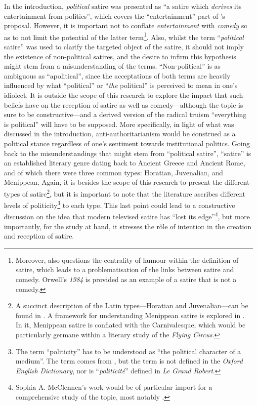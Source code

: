\documentclass[
,a4paper
,DIV=12
,12pt
,abstract
,bibliography=totoc
]{scrartcl}
\begin{document}
In the introduction, \emph{political} satire was presented as \enquote{a satire which \emph{derives} its entertainment from politics}, which covers the \enquote{entertainment} part of \textcite{declercq2018}’s proposal.  However, it is important not to conflate \emph{entertainment} with \emph{comedy} so as to not limit the potential of the latter term\footnote{\label{note-satire-vs-comedy}Moreover, \textcite[320]{declercq2018} also questions the centrality of humour within the definition of satire, which leads to a problematisation of the links between satire and comedy.  Orwell’s \emph{1984} is provided as an example of a satire that is not a comedy.}.  Also, whilst the term \enquote{\emph{political} satire} was used to clarify the targeted object of the satire, it should not imply the existence of non-political satires, and the desire to infirm this hypothesis might stem from a misunderstanding of the terms.  \enquote{Non-political} is as ambiguous as \enquote{apolitical}, since the acceptations of both terms are heavily influenced by what \enquote{political} or \enquote{\emph{the} political} is perceived to mean in one’s idiolect.  It is outside the scope of this research to explore the impact that such beliefs have on the reception of satire as well as comedy---although the topic is sure to be constructive---and a derived version of the radical truism \enquote{everything is political} will have to be supposed.  More specifically, in light of what was discussed in the introduction, anti-authoritarianism would be construed as a political stance regardless of one’s sentiment towards institutional politics.  Going back to the misunderstandings that might stem from \enquote{political satire}, \enquote{satire} is an established literary genre dating back to Ancient Greece and Ancient Rome, and of which there were three common types: Horatian, Juvenalian, and Menippean.  Again, it is besides the scope of this research to present the different types of satire\footnote{A succinct description of the Latin types---Horatian and Juvenalian---can be found in \textcite[104--106]{stott2014}.  A framework for understanding Menippean satire is explored in \textcite{bakhtin1984}.  In it, Menippean satire is conflated with the Carnivalesque, which would be particularly germane within a literary study of the \emph{Flying Circus}.}, but it is important to note that the literature ascribes different levels of politicity\footnote{The term \enquote{politicity} has to be understood as \enquote{the political character of a medium}.  The term comes from \textcite[23]{ranciere2000}, but the term is not defined in the \emph{Oxford English Dictionary}, nor is \enquote{\emph{politicité}} defined in \emph{Le Grand Robert}.} to each type.  This last point could lead to a constructive discussion on the idea that modern televised satire has \enquote{lost its edge}\footnote{Sophia A. McClennen’s work would be of particular import for a comprehensive study of the topic, most notably \textcite{mcclennen2013, mcclennen2014, brasset2019}.}, but more importantly, for the study at hand, it stresses the rôle of intention in the creation and reception of satire.
\end{document}
